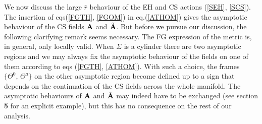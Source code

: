 \documentclass[a4paper,10pt]{article}
\begin{document}
We now discuss the large $\bar r$ behaviour of the EH and CS actions  
(\ref{SEH}, \ref{SCS}).  
The insertion of eqs(\ref{FGTH}, \ref{FGOM}) in eq.(\ref{ATHOM})  
gives the asymptotic behaviour of the CS fields  
$\bf A$ and $\bf \tilde A$. But before we pursue our discussion, the following
clarifying remark seems necessary. The FG expression of the
metric is, in general, only locally valid. When  $\Sigma $ is a cylinder
there are two asymptotic regions and
we may always fix the asymptotic
behaviour of the fields on one of them according 
to eqs (\ref{FGTH}, \ref{ATHOM}). With such a
choice, the frames $\{\Theta^0,\,\Theta^a\}$ on the other
asymptotic region become defined up to a sign 
that depends on the continuation
of the CS fields across the whole manifold. The 
asymptotic behaviours of
$\bf A$ and $\bf \tilde A$ may indeed 
have to be exchanged (see section {\bf 5} for an
explicit example), but this has no consequence 
on the rest of our analysis.
\end{document}
